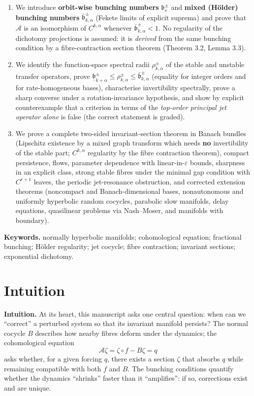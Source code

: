 \documentclass[11pt,a4paper]{article}
\theoremstyle{plain}
\theoremstyle{definition}
\theoremstyle{remark}
\numberwithin{equation}{section}
\numberwithin{figure}{section}
\begin{document}
\begin{enumerate}
\item We introduce \textbf{orbit-wise bunching numbers} $\mathfrak b^\pm_s$ and \textbf{mixed (Hölder) bunching numbers} $\bar{\mathfrak b}^\pm_{k,\alpha}$ (Fekete limits of explicit suprema) and prove that $\mathcal A$ is an isomorphism of $C^{k,\alpha}$ whenever $\bar{\mathfrak b}^\pm_{k,\alpha}<1$. No regularity of the dichotomy projections is assumed: it is \textit{derived} from the same bunching condition by a fibre-contraction section theorem (Theorem 3.2, Lemma 3.3).

\item We identify the function-space spectral radii $\rho^\pm_{k,\alpha}$ of the stable and unstable transfer operators, prove $\underline{\mathfrak b}^\pm_{k+\alpha}\le\rho^\pm_{k,\alpha}\le\bar{\mathfrak b}^\pm_{k,\alpha}$ (equality for integer orders and for rate-homogeneous bases), characterise invertibility spectrally, prove a sharp converse under a rotation-invariance hypothesis, and show by explicit counterexample that a criterion in terms of the \textit{top-order principal jet operator alone} is false (the correct statement is graded).

\item We prove a complete two-sided invariant-section theorem in Banach bundles (Lipschitz existence by a mixed graph transform which needs \textbf{no} invertibility of the stable part; $C^{k,\alpha}$ regularity by the fibre contraction theorem), compact persistence, flows, parameter dependence with linear-in-$\varepsilon$ bounds, sharpness in an explicit class, strong stable fibres under the minimal gap condition with $C^{r+1}$ leaves, the periodic jet-resonance obstruction, and corrected extension theorems (noncompact and Banach-dimensional bases, nonautonomous and uniformly hyperbolic random cocycles, parabolic slow manifolds, delay equations, quasilinear problems via Nash–Moser, and manifolds with boundary).
\end{enumerate}

\textbf{Keywords.} normally hyperbolic manifolds; cohomological equation; fractional bunching; Hölder regularity; jet cocycle; fibre contraction; invariant sections; exponential dichotomy.

\section*{Intuition}

\textbf{Intuition.} At its heart, this manuscript asks one central question: when can we ``correct'' a perturbed system so that its invariant manifold persists? The normal cocycle $B$ describes how nearby fibres deform under the dynamics; the cohomological equation
\[
\mathcal A\zeta = \zeta\circ f - B\zeta = q
\]
asks whether, for a given forcing $q$, there exists a section $\zeta$ that absorbs $q$ while remaining compatible with both $f$ and $B$. The bunching conditions quantify whether the dynamics ``shrinks'' faster than it ``amplifies'': if so, corrections exist and are unique.
\end{document}
